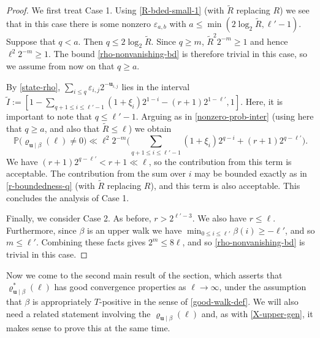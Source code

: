 \documentclass[11pt,reqno]{amsart}
\numberwithin{equation}{section}
\theoremstyle{definition}
\theoremstyle{remark}
\newcommand{\mb}{\mathbb}
\newcommand{\mbf}{\mathbf}
\newcommand{\eps}{\varepsilon}
\renewcommand{\le}{\leqslant}
\renewcommand{\ge}{\geqslant}
\begin{document}
\begin{proof}
We first treat Case 1. Using \cref{R-bded-small-1} (with $\tilde R$ replacing $R$) we see that in this case there is some nonzero $\eps_{a,b}$ with $a \le \min(2\log_2 \tilde R,\ell'-1)$. Suppose that $q < a$. Then $q \le 2 \log_2 \tilde R$. Since $q \ge m$, $\tilde R^2 2^{-m} \ge 1$ and hence $\ell^2 2^{-m} \ge 1$. The bound \cref{rho-nonvanishing-bd} is therefore trivial in this case, so we assume from now on that $q \ge a$. 

By \cref{state-rho}, $\sum_{i \le q} \eps_{i,j} 2^{-\mbf{u}_{i,j}}$ lies in the interval $\tilde I := [1 - \sum_{q + 1 \le i \le \ell' -1} (1 + \xi_i) 2^{1 - i} - (r+1)2^{1 - \ell'}, 1]$. Here, it is important to note that $q \le \ell'-1$. Arguing as in \cref{nonzero-prob-inter} (using here that $q \ge a$, and also that $\tilde R \le \ell$) we obtain 
\[ \mb{P}\big(\varrho_{\mbf{u} \mid \beta}(\ell) \ne 0\big) \ll  \ell^2 2^{-m}\big( \sum_{q + 1 \le i \le \ell' -1} (1 + \xi_i) 2^{q - i} + (r+1)2^{q - \ell'}  \big) . \] We have $(r + 1) 2^{q - \ell'} < r + 1 \ll \ell$, so the contribution from this term is acceptable. The contribution from the sum over $i$ may be bounded exactly as in \cref{r-boundedness-q} (with $\tilde R$ replacing $R$), and this term is also acceptable. This concludes the analysis of Case 1.

Finally, we consider Case 2. As before, $r > 2^{\ell' - 3}$. We also have $r \le \ell$. Furthermore, since $\beta$ is an upper walk we have $\min_{0 \le i \le \ell'} \beta(i) \ge {-}\ell'$, and so $m \le \ell'$. Combining these facts gives $2^m \le 8 \ell$, and so \cref{rho-nonvanishing-bd} is trivial in this case.\end{proof}

Now we come to the second main result of the section, which asserts that $\varrho^*_{\mbf{u} \mid \beta}(\ell)$ has good convergence properties as $\ell \rightarrow \infty$, under the assumption that $\beta$ is appropriately $T$-positive in the sense of \cref{good-walk-def}. We will also need a related statement involving the $\varrho_{\mbf{u} \mid \beta}(\ell)$ and, as with \cref{X-upper-gen}, it makes sense to prove this at the same time. 
\end{document}
